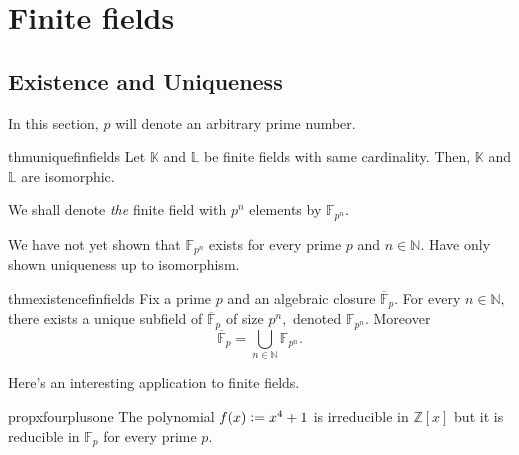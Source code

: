 \chapter{Finite fields}

\section{Existence and Uniqueness}

In this section, $p$ will denote an arbitrary prime number.

\begin{restatable}{thm}{uniquefinfields}
\label{thm:uniquefinfields}
    Let $\mathbb{K}$ and $\mathbb{L}$ be finite fields with same cardinality. Then, $\mathbb{K}$ and $\mathbb{L}$ are isomorphic. \hfill\hyperref[thm:uniquefinfields2]{\downsym}
\end{restatable}

\begin{defn}%
    We shall denote \emph{the} finite field with $p^n$ elements by $\mathbb{F}_{p^n}.$
\end{defn}

\begin{rem}
    We have not yet shown that $\mathbb{F}_{p^n}$ exists for every prime $p$ and $n \in \mathbb{N}.$ Have only shown uniqueness up to isomorphism.
\end{rem}

\begin{restatable}{thm}{existencefinfields}
\label{thm:existencefinfields}
    Fix a prime $p$ and an algebraic closure $\overline{\mathbb{F}}_p.$ For every $n \in \mathbb{N},$ there exists a unique subfield of $\overline{\mathbb{F}}_p$ of size $p^n,$ denoted $\mathbb{F}_{p^n}.$ Moreover
    \begin{equation*} 
        \overline{\mathbb{F}}_p = \bigcup_{n \in \mathbb{N}} \mathbb{F}_{p^n}.
    \end{equation*}
    \hfill\hyperref[thm:existencefinfields2]{\downsym}
\end{restatable}

Here's an interesting application to finite fields.

\begin{restatable}[]{prop}{xfourplusone}
\label{prop:xfourplusone}
    The polynomial $f(x) \vcentcolon= x^4 + 1$ is irreducible in $\mathbb{Z}[x]$ but it is reducible in $\mathbb{F}_p$ for every prime $p.$ \hfill\hyperref[prop:xfourplusone2]{\downsym}
\end{restatable}

